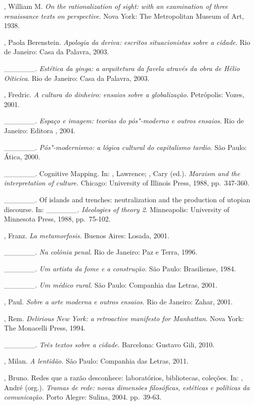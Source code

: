 \begin{Parskip}
, William M. \emph{On the rationalization of sight: with an
examination of three renaissance texts on perspective}. Nova York: The
Metropolitan Museum of Art, 1938.

, Paola Berenstein. \emph{Apologia da deriva: escritos
situacionistas sobre a cidade}. Rio de Janeiro: Casa da Palavra, 2003.

\_\_\_\_\_\_. \emph{Estética da ginga: a arquitetura da favela
através da obra de Hélio Oiticica}. Rio de Janeiro: Casa da Palavra,
2003.

, Fredric. \emph{A cultura do dinheiro: ensaios sobre a
globalização}. Petrópolis: Vozes, 2001.

\_\_\_\_\_\_. \emph{Espaço e imagem: teorias do pós"-moderno e
outros ensaios}. Rio de Janeiro: Editora , 2004.

\_\_\_\_\_\_. \emph{Pós"-modernismo: a lógica cultural do
capitalismo tardio}. São Paulo: Ática, 2000.

\_\_\_\_\_\_. Cognitive Mapping. In: , Lawrence; ,
Cary (ed.). \emph{Marxism and the interpretation of culture.} Chicago:
University of Illinois Press, 1988, pp.~347-360.

\_\_\_\_\_\_. Of islands and trenches: neutralization and the
production of utopian discourse. In: \_\_\_\_\_\_.
\emph{Ideologies of theory 2}. Minneapolis: University of Minnesota
Press, 1988, pp.~75-102.

, Franz. \emph{La metamorfosis.} Buenos Aires: Losada, 2001.

\_\_\_\_\_\_. \emph{Na colônia penal}. Rio de Janeiro: Paz e Terra, 1996.

\_\_\_\_\_\_. \emph{Um artista da fome e a construção.} São Paulo:
Brasiliense, 1984.

\_\_\_\_\_\_. \emph{Um médico rural.} São Paulo: Companhia das
Letras, 2001.

, Paul. \emph{Sobre a arte moderna e outros ensaios.} Rio de
Janeiro: Zahar, 2001.

, Rem. \emph{Delirious New York: a retroactive manifesto for
Manhattan}. Nova York: The Monacelli Press, 1994.

\_\_\_\_\_\_. \emph{Três textos sobre a cidade.} Barcelona:
Gustavo Gili, 2010.

, Milan. \emph{A lentidão.} São Paulo: Companhia das Letras,
2011.

, Bruno. Redes que a razão desconhece: laboratórios,
bibliotecas, coleções. In: , André (org.). \emph{Tramas de
rede: novas dimensões filosóficas, estéticas e políticas da
comunicação}. Porto Alegre: Sulina, 2004. pp.~39-63.


\end{Parskip}

